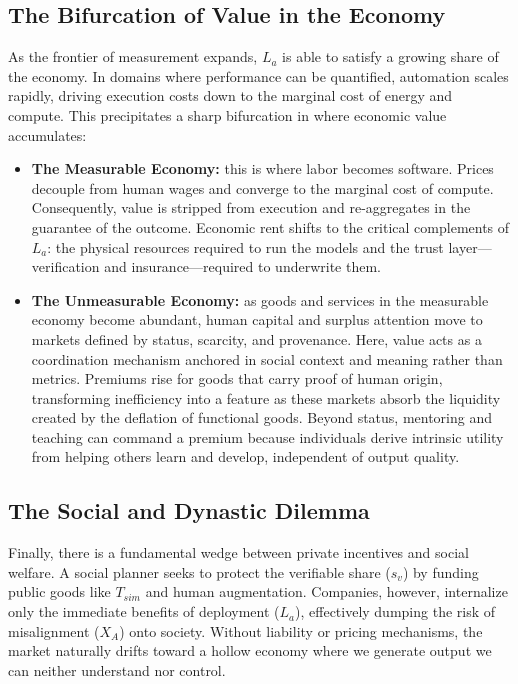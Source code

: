 \documentclass[12pt, letter]{article}
\begin{document}
\subsection{The Bifurcation of Value in the Economy}

As the frontier of measurement expands, $L_a$ is able to satisfy a growing share of the economy. In domains where performance can be quantified, automation scales rapidly, driving execution costs down to the marginal cost of energy and compute. This precipitates a sharp bifurcation in where economic value accumulates:

\begin{itemize} 
\item \textbf{The Measurable Economy:} this is where labor becomes software. Prices decouple from human wages and converge to the marginal cost of compute. Consequently, value is stripped from execution and re-aggregates in the guarantee of the outcome. Economic rent shifts to the critical complements of $L_a$: the physical resources required to run the models and the trust layer—verification and insurance—required to underwrite them.

\item \textbf{The Unmeasurable Economy:} as goods and services in the measurable economy become abundant, human capital and surplus attention move to markets defined by status, scarcity, and provenance. Here, value acts as a coordination mechanism anchored in social context and meaning rather than metrics. Premiums rise for goods that carry proof of human origin, transforming inefficiency into a feature as these markets absorb the liquidity created by the deflation of functional goods.  Beyond status, mentoring and teaching can command a premium because individuals derive intrinsic utility from helping others learn and develop, independent of output quality.

\end{itemize}

\subsection{The Social and Dynastic Dilemma}

Finally, there is a fundamental wedge between private incentives and social welfare. A social planner seeks to protect the verifiable share ($s_v$) by funding public goods like $T_{sim}$ and human augmentation. Companies, however, internalize only the immediate benefits of deployment ($L_a$), effectively dumping the risk of misalignment ($X_A$) onto society. Without liability or pricing mechanisms, the market naturally drifts toward a hollow economy where we generate output we can neither understand nor control. 
\end{document}
